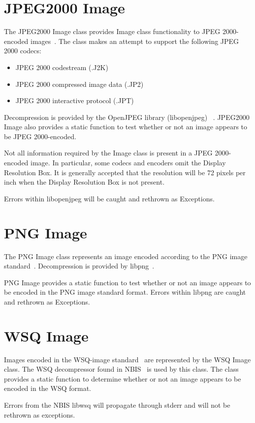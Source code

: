 \section{JPEG2000 Image}
\label{sec-jpeg2000image}
The JPEG2000 Image class provides Image class functionality to JPEG 2000-encoded
images~\cite{jpeg2000}.  The class makes an attempt to support the following
JPEG 2000 codecs:
\begin{itemize}
\item JPEG 2000 codestream (.J2K)
\item JPEG 2000 compressed image data (.JP2)
\item JPEG 2000 interactive protocol (.JPT)
\end{itemize}
Decompression is provided by the OpenJPEG library (libopenjpeg)
~\cite{libopenjpeg}.  JPEG2000 Image also provides a static function to test
whether or not an image appears to be JPEG 2000-encoded.

Not all information required by the Image class is present in a JPEG 
2000-encoded image.  In particular, some codecs and encoders omit the Display
Resolution Box.  It is generally accepted that the resolution will be 72 pixels
per inch when the Display Resolution Box is not present.

Errors within libopenjpeg will be caught and rethrown as Exceptions.

\section{PNG Image}
\label{sec-pngimage}
The PNG Image class represents an image encoded according to the PNG image 
standard~\cite{png}.  Decompression is provided by libpng~\cite{libpng}.

PNG Image provides a static function to test whether or not an image appears
to be encoded in the PNG image standard format.  Errors within libpng are
caught and rethrown as Exceptions.

\section{WSQ Image}
\label{sec-wsqimage}
Images encoded in the WSQ-image standard~\cite{wsq} are represented by the WSQ
Image class.  The WSQ decompressor found in NBIS~\cite{nbis} is used by this
class.  The class provides a static function to determine whether or not an
image appears to be encoded in the WSQ format.

Errors from the NBIS libwsq will propagate through stderr and will not be
rethrown as exceptions.

